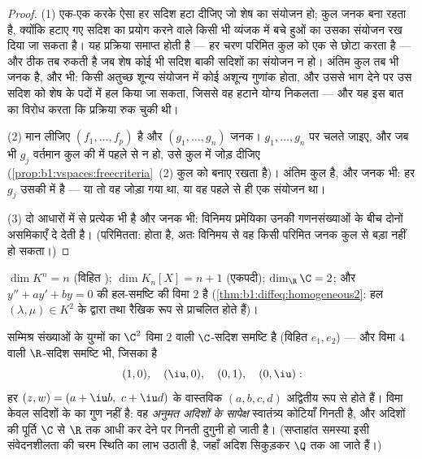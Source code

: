 \begin{proof}
(1) एक-एक करके ऐसा हर सदिश हटा दीजिए जो शेष का संयोजन हो; कुल जनक बना रहता
है, क्योंकि हटाए गए सदिश का प्रयोग करने वाले किसी भी व्यंजक में बचे हुओं का
उसका संयोजन रख दिया जा सकता है। यह प्रक्रिया समाप्त होती है --- हर चरण
परिमित कुल को एक से छोटा करता है --- और ठीक तब रुकती है जब शेष कोई भी सदिश
बाकी सदिशों का संयोजन न हो। अंतिम कुल तब भी जनक है, और  भी: किसी
अतुच्छ शून्य संयोजन में कोई अशून्य गुणांक होता, और उससे भाग देने पर उस सदिश
को शेष के पदों में हल किया जा सकता, जिससे वह हटाने योग्य निकलता --- और यह इस
बात का विरोध करता कि प्रक्रिया रुक चुकी थी।

(2) मान लीजिए $(f_1, \dots, f_p)$  है और $(g_1, \dots, g_n)$ जनक।
$g_1, \dots, g_n$ पर चलते जाइए, और जब भी $g_j$ वर्तमान कुल की 
में पहले से न हो, उसे कुल में जोड़ दीजिए
(\cref{prop:b1:vspaces:freecriteria}~(2) कुल को  बनाए रखता है)।
अंतिम कुल  है, और जनक भी: हर $g_j$ उसकी  में है --- या तो
वह जोड़ा गया था, या वह पहले से ही एक संयोजन था।

(3) दो आधारों में से प्रत्येक  भी है और जनक भी: विनिमय प्रमेयिका
उनकी गणनसंख्याओं के बीच दोनों असमिकाएँ दे देती है। (परिमितता:  
होता है, अतः विनिमय से वह किसी परिमित जनक कुल से बड़ा नहीं हो सकता।)
\end{proof}

\begin{example}\label{ex:b1:findim:dims}
$\dim K^n = n$ (विहित ); $\dim K_n[X] = n + 1$ (एकपदी); $\dim_\R \C =
2$; और $y'' + ay' + by = 0$ की हल-समष्टि की विमा $2$ है
(\cref{thm:b1:diffeq:homogeneous2}: हल $(\lambda, \mu) \in K^2$ के द्वारा
 तथा रैखिक रूप से प्राचलित होते हैं)।
\end{example}

\begin{example}[एक ही समुच्चय, दो विमाएँ]
\label{ex:b1:findim:twodimensions}
सम्मिश्र संख्याओं के युग्मों का  $\C^2$ विमा $2$ वाली $\C$-सदिश
समष्टि है (विहित  $e_1, e_2$) --- और विमा $4$ वाली $\R$-सदिश समष्टि भी,
जिसका  है
\[
(1, 0),\quad (\iu, 0),\quad (0, 1),\quad (0, \iu):
\]
हर $(z, w) = (a + \iu b,\ c + \iu d)$ के वास्तविक  $(a, b, c, d)$
अद्वितीय रूप से होते हैं। विमा केवल सदिशों के  का गुण नहीं है: वह
\emph{अनुमत अदिशों के सापेक्ष} स्वातंत्र्य कोटियाँ गिनती है, और अदिशों की
पूर्ति $\C$ से $\R$ तक आधी कर देने पर गिनती दुगुनी हो जाती है। (सप्ताहांत
समस्या इसी संवेदनशीलता की चरम स्थिति का लाभ उठाती है, जहाँ अदिश सिकुड़कर
$\Q$ तक आ जाते हैं।)
\end{example}

